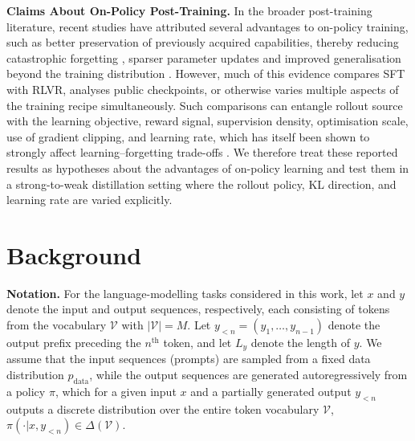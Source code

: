 \documentclass{article} %
\theoremstyle{plain}
\theoremstyle{definition}
\theoremstyle{remark}
\begin{document}
\textbf{Claims About On-Policy Post-Training.}
In the broader post-training literature, recent studies have attributed several advantages to on-policy training, such as better preservation of previously acquired capabilities, thereby reducing catastrophic forgetting \citep{shenfeld_rls_2025, chen_retaining_2025, shenfeld_self-distillation_2026, lu2025onpolicydistillation}, sparser parameter updates \citep{mukherjee_reinforcement_2025, yu_dense_2026} and improved generalisation beyond the training distribution \citep{chu_sft_2025, yuan2026f, zhang_towards_2026, ming_one-token_2026}. However, much of this evidence compares SFT with RLVR, analyses public checkpoints, or otherwise varies multiple aspects of the training recipe simultaneously. Such comparisons can entangle rollout source with the learning objective, reward signal, supervision density, optimisation scale, use of gradient clipping, and learning rate, which has itself been shown to strongly affect learning--forgetting trade-offs \citep{catalan-tatjer_learning-forgetting_2026, rofin_how_2026}. We therefore treat these reported results as hypotheses about the advantages of on-policy learning and test them in a strong-to-weak distillation setting where the rollout policy, KL direction, and learning rate are varied explicitly.


\section{Background}
\label{sec:background}

\textbf{Notation.} For the language-modelling tasks considered in this work, let $x$ and $y$ denote the input and output sequences, respectively, each consisting of tokens from the vocabulary $\mathcal{V}$ with $|\mathcal{V}|=M$. Let $y_{<n} = (y_1, \dots, y_{n-1})$ denote the output prefix preceding the $n^{\text{th}}$ token, and let $L_y$ denote the length of $y$. We assume that the input sequences (prompts) are sampled from a fixed data distribution $p_{\mathrm{data}}$, while the output sequences are generated autoregressively from a policy $\pi$, which for a given input $x$ and a partially generated output $y_{<n}$ outputs a discrete distribution over the entire token vocabulary $\mathcal{V}$, $\pi(\cdot | x, y_{<n}) \in \Delta(\mathcal{V})$. 
\end{document}
